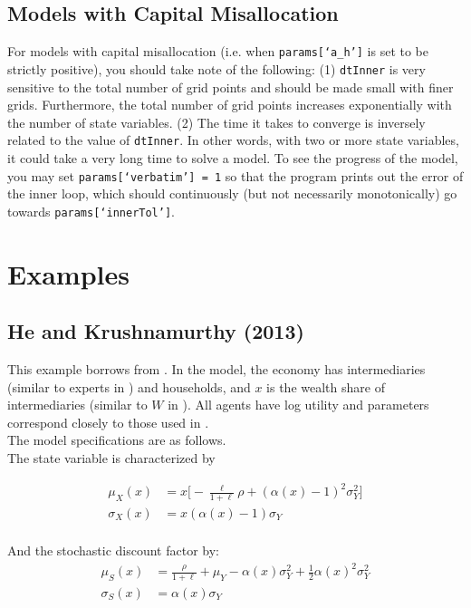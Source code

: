 \documentclass[12pt]{article}
\newcommand{\wealthSymbol}{$W$\xspace}
\newcommand{\TFPhProg}{a\_h\xspace}
\begin{document}
\subsection{Models with Capital Misallocation}\label{sec:modelCapMis}
For models with capital misallocation  (i.e. when \texttt{params[`\TFPhProg']} is set to be strictly positive), you should take note of the following: (1) \texttt{dtInner} is very sensitive to the total number of grid points and should be made small with finer grids. Furthermore, the total number of grid points increases exponentially with the number of state variables. (2) The time it takes to converge is inversely related to the value of \texttt{dtInner}. In other words, with two or more state variables, it could take a very long time to solve a model. To see the progress of the model, you may set \texttt{params[`verbatim'] = 1} so that the program prints out the error of the inner loop, which should continuously (but not necessarily monotonically) go towards \texttt{params[`innerTol']}.

\newpage

\section{Examples}\label{examplesSec}

\subsection{He and Krushnamurthy (2013)}\label{HKExample}
This example borrows from \citet{HK2013}. In the model, the economy has intermediaries (similar to experts in \citet{HKT}) and households, and $x$ is the wealth share of intermediaries (similar to \wealthSymbol in \citet{HKT}). All agents have log utility and parameters correspond closely to those used in \citet{HK2013}.\\

The model specifications are as follows. \\

The state variable is characterized by

\begin{align*}
	\mu_X(x) &= x\Big[ -\frac{\ell}{1+\ell} \rho + (\alpha(x) - 1)^2 \sigma_Y^2 \Big] \\
	\sigma_X(x) &= x(\alpha(x) - 1) \sigma_Y \\
\end{align*}

And the stochastic discount factor by:
\begin{align*}
	\mu_S(x) &= \frac{\rho}{1+\ell} + \mu_Y - \alpha(x) \sigma_Y^2 + \frac{1}{2} \alpha(x)^2 \sigma_Y^2 \\
	\sigma_S(x) &= \alpha(x) \sigma_Y
\end{align*}
\end{document}
